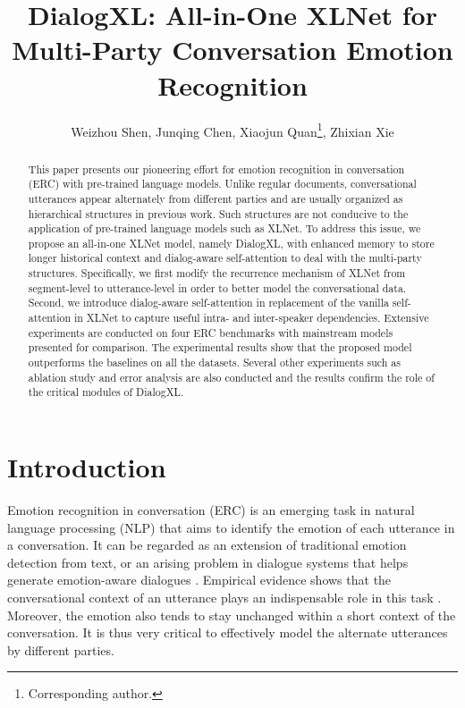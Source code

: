 \documentclass[letterpaper]{article} \usepackage{aaai21}  \usepackage{times}  \usepackage{helvet} \usepackage{courier}  \usepackage[hyphens]{url}  \usepackage{graphicx} \usepackage{amstext}
\title{DialogXL: All-in-One XLNet for Multi-Party Conversation Emotion Recognition}
\author{
Weizhou Shen,
    Junqing Chen,
    Xiaojun Quan\thanks{Corresponding author.},
    Zhixian Xie
    \\
}
\begin{document}
\maketitle


\begin{abstract}
	This paper presents our pioneering effort for emotion recognition in conversation (ERC) with pre-trained language models. Unlike regular documents, conversational utterances appear alternately from different parties and are usually organized as hierarchical structures in previous work. Such structures are not conducive to the application of pre-trained language models such as XLNet. To address this issue, we propose an all-in-one XLNet model, namely DialogXL, with enhanced memory to store longer historical context and dialog-aware self-attention to deal with the multi-party structures. Specifically, we first modify the recurrence mechanism of XLNet from segment-level to utterance-level in order to better model the conversational data. Second, we introduce dialog-aware self-attention in replacement of the vanilla self-attention in XLNet to capture useful intra- and inter-speaker dependencies. Extensive experiments are conducted on four ERC benchmarks with mainstream models presented for comparison. The experimental results show that the proposed model outperforms the baselines on all the datasets. Several other experiments such as ablation study and error analysis are also conducted and the results confirm the role of the critical modules of DialogXL.
\end{abstract}

\section{Introduction}
Emotion recognition in conversation (ERC) is an emerging task in natural language processing (NLP) that aims to identify the emotion of each utterance in a conversation. It can be regarded as an extension of traditional emotion detection from text, or an arising problem in dialogue systems that helps generate emotion-aware dialogues \cite{zhou2017emotional}. Empirical evidence shows that the conversational context of an utterance plays an indispensable role in this task \cite{poria2019emotion}. Moreover, the emotion also tends to stay unchanged within a short context of the conversation. It is thus very critical to effectively model the alternate utterances by different parties.
\end{document}
